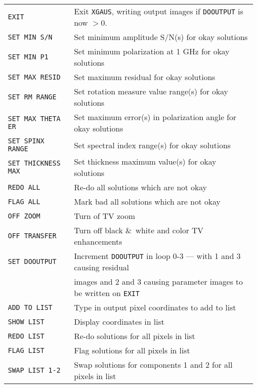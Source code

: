 \documentclass[twoside]{article}
\begin{document}
\begin{center}
\begin{tabular}{|l|l|}\hline
 {\tt EXIT           } & Exit {\tt XGAUS}, writing output images if
                         {\tt DOOUTPUT} is now $> 0.$\\
 {\tt SET MIN S/N    } & Set minimum amplitude S/N(s) for okay
                         solutions\\
 {\tt SET MIN P1     } & Set minimum polarization at 1 GHz for okay
                         solutions\\
 {\tt SET MAX RESID  } & Set maximum residual for okay solutions\\
 {\tt SET RM RANGE   } & Set rotation measure value range(s) for okay
                         solutions\\
 {\tt SET MAX THETA ER} & Set maximum error(s) in polarization angle
                         for okay solutions\\
 {\tt SET SPINX RANGE} & Set spectral index range(s) for okay
                         solutions\\
 {\tt SET THICKNESS MAX} & Set thickness maximum value(s) for okay
                         solutions\\
 {\tt REDO ALL       } & Re-do all solutions which are not okay\\
 {\tt FLAG ALL       } & Mark bad all solutions which are not okay\\
 {\tt OFF ZOOM       } & Turn of TV zoom\\
 {\tt OFF TRANSFER   } & Turn off black \&\ white and color TV
                         enhancements\\
 {\tt SET DOOUTPUT   } & Increment {\tt DOOUTPUT} in loop 0-3 --- with
                         1 and 3 causing residual\\
                       & images and 2 and 3 causing parameter images
                         to be written on {\tt EXIT}\\
 {\tt ADD TO LIST    } & Type in output pixel coordinates to add to
                         list\\
 {\tt SHOW LIST      } & Display coordinates in list\\
 {\tt REDO LIST      } & Re-do solutions for all pixels in list\\
 {\tt FLAG LIST      } & Flag solutions for all pixels in list\\
 {\tt SWAP LIST 1-2  } & Swap solutions for components 1 and 2 for all
                         pixels in list\\ \hline
\end{tabular}
\end{center}
\end{document}
